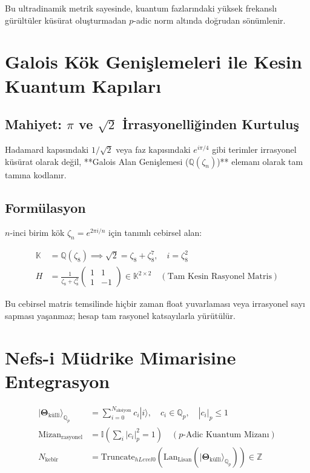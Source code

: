 \documentclass[11pt, a4paper]{article}
\begin{document}
Bu ultradinamik metrik sayesinde, kuantum fazlarındaki yüksek frekanslı gürültüler küsürat oluşturmadan $p$-adic norm altında doğrudan sönümlenir.

\section{Galois Kök Genişlemeleri ile Kesin Kuantum Kapıları}

\subsection{Mahiyet: $\pi$ ve $\sqrt{2}$ İrrasyonelliğinden Kurtuluş}
Hadamard kapısındaki $1/\sqrt{2}$ veya faz kapısındaki $e^{i\pi/4}$ gibi terimler irrasyonel küsürat olarak değil, **Galois Alan Genişlemesi ($\mathbb{Q}(\zeta_n)$)** elemanı olarak tam tamına kodlanır.

\subsection{Formülasyon}
$n$-inci birim kök $\zeta_n = e^{2\pi i / n}$ için tanımlı cebirsel alan:

\begin{align}
\mathbb{K} &= \mathbb{Q}(\zeta_8) \implies \sqrt{2} = \zeta_8 + \zeta_8^7, \quad i = \zeta_8^2 \\
H &= \frac{1}{\zeta_8 + \zeta_8^7} \begin{pmatrix} 1 & 1 \\ 1 & -1 \end{pmatrix} \in \mathbb{K}^{2 \times 2} \quad (\text{Tam Kesin Rasyonel Matris})
\end{align}

Bu cebirsel matris temsilinde hiçbir zaman float yuvarlaması veya irrasyonel sayı sapması yaşanmaz; hesap tam rasyonel katsayılarla yürütülür.

\section{Nefs-i Müdrike Mimarisine Entegrasyon}

\begin{align}
|\mathbf{\Theta}_{\text{küllî}}\rangle_{\mathbb{Q}_p} &= \sum_{i=0}^{N_{\text{aksiyom}}} c_i |i\rangle, \quad c_i \in \mathbb{Q}_p, \quad |c_i|_p \le 1 \\
\text{Mizan}_{\text{rasyonel}} &= \mathbb{I}\left( \sum_i |c_i|_p^2 = 1 \right) \quad (\text{$p$-Adic Kuantum Mizanı}) \\
N_{\text{kebîr}} &= \text{Truncate}_{hLevel 0} \left( \text{Lan}_{\text{Lisan}} \left( |\mathbf{\Theta}_{\text{küllî}}\rangle_{\mathbb{Q}_p} \right) \right) \in \mathbb{Z}
\end{align}
\end{document}
